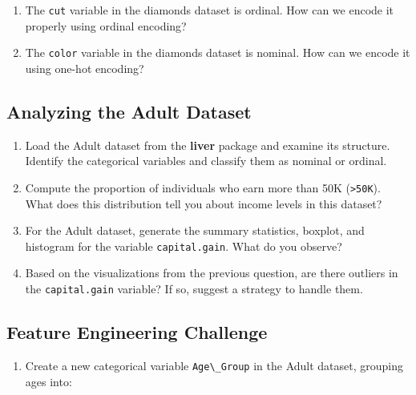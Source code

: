 \documentclass[
]{book}
\newcommand{\passthrough}[1]{#1}
\providecommand{\tightlist}{%
  \setlength{\itemsep}{0pt}\setlength{\parskip}{0pt}}
\theoremstyle{definition}
\theoremstyle{definition}
\theoremstyle{definition}
\theoremstyle{definition}
\theoremstyle{remark}
\begin{document}
\begin{enumerate}
\def\labelenumi{\arabic{enumi}.}
\setcounter{enumi}{7}
\tightlist
\item
  The \passthrough{\lstinline!cut!} variable in the diamonds dataset is ordinal. How can we encode it properly using ordinal encoding?\\
\item
  The \passthrough{\lstinline!color!} variable in the diamonds dataset is nominal. How can we encode it using one-hot encoding?
\end{enumerate}

\subsection*{Analyzing the Adult Dataset}\label{analyzing-the-adult-dataset}

\begin{enumerate}
\def\labelenumi{\arabic{enumi}.}
\setcounter{enumi}{9}
\tightlist
\item
  Load the Adult dataset from the \textbf{liver} package and examine its structure. Identify the categorical variables and classify them as nominal or ordinal.\\
\item
  Compute the proportion of individuals who earn more than 50K (\passthrough{\lstinline!>50K!}). What does this distribution tell you about income levels in this dataset?\\
\item
  For the Adult dataset, generate the summary statistics, boxplot, and histogram for the variable \passthrough{\lstinline!capital.gain!}. What do you observe?\\
\item
  Based on the visualizations from the previous question, are there outliers in the \passthrough{\lstinline!capital.gain!} variable? If so, suggest a strategy to handle them.
\end{enumerate}

\subsection*{Feature Engineering Challenge}\label{feature-engineering-challenge}

\begin{enumerate}
\def\labelenumi{\arabic{enumi}.}
\setcounter{enumi}{13}
\tightlist
\item
  Create a new categorical variable \passthrough{\lstinline!Age\_Group!} in the Adult dataset, grouping ages into:\\
\end{enumerate}
\end{document}
